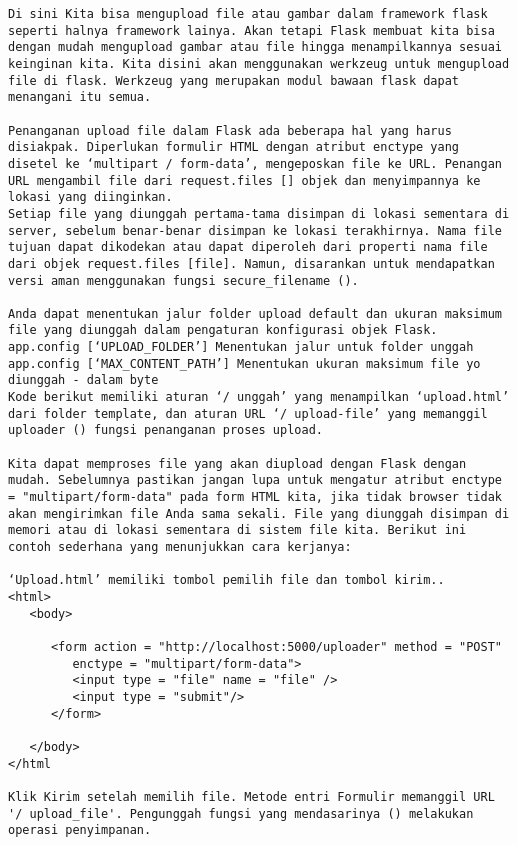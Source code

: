 \documentclass[12pt,a4paper]{article}
\begin{document}
\begin{verbatim}
Di sini Kita bisa mengupload file atau gambar dalam framework flask seperti halnya framework lainya. Akan tetapi Flask membuat kita bisa dengan mudah mengupload gambar atau file hingga menampilkannya sesuai keinginan kita. Kita disini akan menggunakan werkzeug untuk mengupload file di flask. Werkzeug yang merupakan modul bawaan flask dapat menangani itu semua.

Penanganan upload file dalam Flask ada beberapa hal yang harus disiakpak. Diperlukan formulir HTML dengan atribut enctype yang disetel ke ‘multipart / form-data’, mengeposkan file ke URL. Penangan URL mengambil file dari request.files [] objek dan menyimpannya ke lokasi yang diinginkan.
Setiap file yang diunggah pertama-tama disimpan di lokasi sementara di server, sebelum benar-benar disimpan ke lokasi terakhirnya. Nama file tujuan dapat dikodekan atau dapat diperoleh dari properti nama file dari objek request.files [file]. Namun, disarankan untuk mendapatkan versi aman menggunakan fungsi secure_filename ().

Anda dapat menentukan jalur folder upload default dan ukuran maksimum file yang diunggah dalam pengaturan konfigurasi objek Flask.
app.config [‘UPLOAD_FOLDER’] Menentukan jalur untuk folder unggah
app.config [‘MAX_CONTENT_PATH’] Menentukan ukuran maksimum file yo diunggah - dalam byte
Kode berikut memiliki aturan ‘/ unggah’ yang menampilkan ‘upload.html’ dari folder template, dan aturan URL ‘/ upload-file’ yang memanggil uploader () fungsi penanganan proses upload.

Kita dapat memproses file yang akan diupload dengan Flask dengan mudah. Sebelumnya pastikan jangan lupa untuk mengatur atribut enctype = "multipart/form-data" pada form HTML kita, jika tidak browser tidak akan mengirimkan file Anda sama sekali. File yang diunggah disimpan di memori atau di lokasi sementara di sistem file kita. Berikut ini contoh sederhana yang menunjukkan cara kerjanya:

‘Upload.html’ memiliki tombol pemilih file dan tombol kirim..
<html>
   <body>
   
      <form action = "http://localhost:5000/uploader" method = "POST" 
         enctype = "multipart/form-data">
         <input type = "file" name = "file" />
         <input type = "submit"/>
      </form>
      
   </body>
</html

Klik Kirim setelah memilih file. Metode entri Formulir memanggil URL '/ upload_file'. Pengunggah fungsi yang mendasarinya () melakukan operasi penyimpanan.


\end{verbatim}
\end{document}
